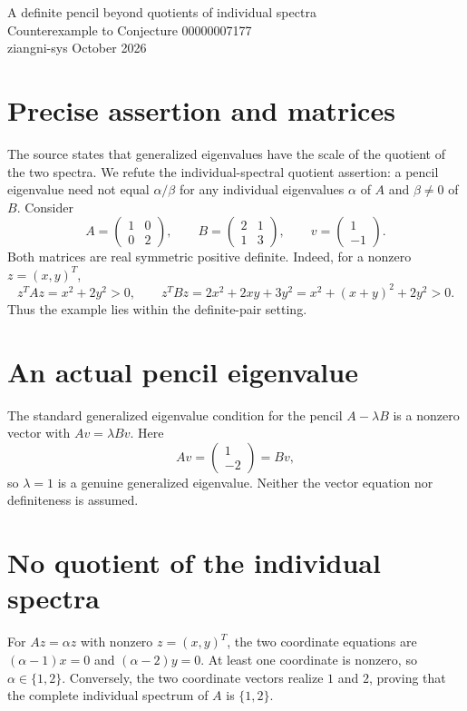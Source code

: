 \documentclass[10pt,a4paper]{article}
\begin{document}
\begin{center}
{\Large A definite pencil beyond quotients of individual spectra}\\[4pt]
{\large Counterexample to Conjecture 00000007177}\\[6pt]
ziangni-sys  October 2026
\end{center}

\section*{Precise assertion and matrices}
The source states that generalized eigenvalues have the scale of
the quotient of the two spectra. We refute the individual-spectral
quotient assertion: a pencil eigenvalue need not equal $\alpha/\beta$
for any individual eigenvalues $\alpha$ of $A$ and $\beta\ne0$ of $B$.
Consider
\[
A=\begin{pmatrix}1&0\\0&2\end{pmatrix},\qquad
B=\begin{pmatrix}2&1\\1&3\end{pmatrix},\qquad
v=\begin{pmatrix}1\\-1\end{pmatrix}.
\]
Both matrices are real symmetric positive definite. Indeed, for a
nonzero $z=(x,y)^T$,
\[
z^TAz=x^2+2y^2>0,\qquad
z^TBz=2x^2+2xy+3y^2=x^2+(x+y)^2+2y^2>0.
\]
Thus the example lies within the definite-pair setting.

\section*{An actual pencil eigenvalue}
The standard generalized eigenvalue condition for the pencil
$A-\lambda B$ is a nonzero vector with $Av=\lambda Bv$. Here
\[
Av=\begin{pmatrix}1\\-2\end{pmatrix}=Bv,
\]
so $\lambda=1$ is a genuine generalized eigenvalue.
Neither the vector equation nor definiteness is assumed.

\section*{No quotient of the individual spectra}
For $Az=\alpha z$ with nonzero $z=(x,y)^T$, the two coordinate equations
are $(\alpha-1)x=0$ and $(\alpha-2)y=0$.
At least one coordinate is nonzero, so $\alpha\in\{1,2\}$.
Conversely, the two coordinate vectors realize $1$ and $2$, proving
that the complete individual spectrum of $A$ is $\{1,2\}$.
\end{document}
